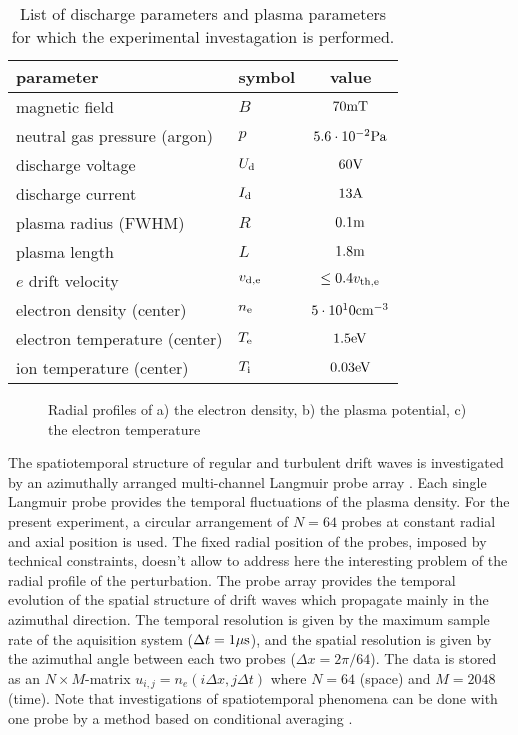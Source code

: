 \begin{table}[htb]
 \begin{center}
  \caption{List of discharge parameters and plasma parameters for which
          the experimental investagation is performed.}
  \label{param}
  \begin{tabular}{l|l|c}
     parameter                    & symbol & value\\
     \hline\hline
     magnetic field               & $B$           & $70{\rm mT}$ \\
     neutral gas pressure (argon) & $p$           & $5.6\cdot 10^{-2}
{\rm Pa}$ \\
     discharge voltage            & $U_{\rm d}$   & $60{\rm V}$\\
     discharge current            & $I_{\rm d}$   & $13{\rm A}$\\
     plasma radius (FWHM)         & $R$           & $0.1{\rm m}$\\
     plasma length                & $L$           & $1.8{\rm m}$\\
     $e$ drift velocity           & $v_{\rm d,e}$ & 
$\leq 0.4v_{\rm th,e}$\\
     \hline
     electron density (center)     & $n_{\rm e}$   & 
$5 \cdot 10^10{\rm cm}^{-3}$\\
     electron temperature (center) & $T_{\rm e}$   & $1.5{\rm eV}$\\
     ion temperature (center)      & $T_{\rm i}$   & $0.03{\rm eV}$\\
     \hline\hline
  \end{tabular}
 \end{center}
\end{table}
%
\begin{figure}[htb]
 \centering
 \caption{Radial profiles of a) the electron density, b) the plasma 
potential, c) the electron temperature}
 \label{profiles}
\end{figure}
%
The spatiotemporal structure of regular and turbulent drift waves is
investigated by an azimuthally arranged multi-channel Langmuir probe 
array \cite{latten95}. Each single Langmuir probe provides the temporal 
fluctuations of the plasma density. For the present experiment, a
circular arrangement of $N=64$ probes at constant radial and axial 
position is used.
The fixed radial position of the probes, imposed by technical 
constraints, doesn't allow to address here the interesting problem
of the radial profile of the perturbation.
The probe array provides the temporal evolution of the spatial 
structure of drift waves which propagate mainly in the azimuthal 
direction. The temporal resolution is given by the maximum sample 
rate of the aquisition system ($\Delta t=1\mu{\rm s}$), and the spatial
resolution is given by the azimuthal angle between each two probes
($\Delta x=2\pi/64$). The data is stored as an $N \times M$-matrix
$u_{i,j}=n_{e}(i\Delta x,j\Delta t)$ where $N=64$ (space) and $M=2048$ 
(time). 
Note that investigations of spatiotemporal phenomena
can be done with one probe by a method based on conditional averaging
\cite{Iizuka}.

